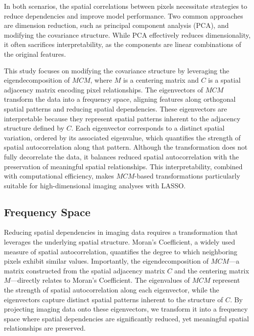 \documentclass[12pt]{article}
\begin{document}
In both scenarios, the spatial correlations between pixels necessitate strategies to reduce dependencies and improve model performance. Two common approaches are dimension reduction, such as principal component analysis (PCA), and modifying the covariance structure. While PCA effectively reduces dimensionality, it often sacrifices interpretability, as the components are linear combinations of the original features.

This study focuses on modifying the covariance structure by leveraging the eigendecomposition of \( MCM \), where \( M \) is a centering matrix and \( C \) is a spatial adjacency matrix encoding pixel relationships. The eigenvectors of \( MCM \) transform the data into a frequency space, aligning features along orthogonal spatial patterns and reducing spatial dependencies. These eigenvectors are interpretable because they represent spatial patterns inherent to the adjacency structure defined by \( C \). Each eigenvector corresponds to a distinct spatial variation, ordered by its associated eigenvalue, which quantifies the strength of spatial autocorrelation along that pattern. Although the transformation does not fully decorrelate the data, it balances reduced spatial autocorrelation with the preservation of meaningful spatial relationships. This interpretability, combined with computational efficiency, makes \( MCM \)-based transformations particularly suitable for high-dimensional imaging analyses with LASSO.


\subsection{Frequency Space}

Reducing spatial dependencies in imaging data requires a transformation that leverages the underlying spatial structure. Moran's Coefficient, a widely used measure of spatial autocorrelation, quantifies the degree to which neighboring pixels exhibit similar values. Importantly, the eigendecomposition of \( MCM \)—a matrix constructed from the spatial adjacency matrix \( C \) and the centering matrix \( M \)—directly relates to Moran's Coefficient. The eigenvalues of \( MCM \) represent the strength of spatial autocorrelation along each eigenvector, while the eigenvectors capture distinct spatial patterns inherent to the structure of \( C \). By projecting imaging data onto these eigenvectors, we transform it into a frequency space where spatial dependencies are significantly reduced, yet meaningful spatial relationships are preserved.
\end{document}

